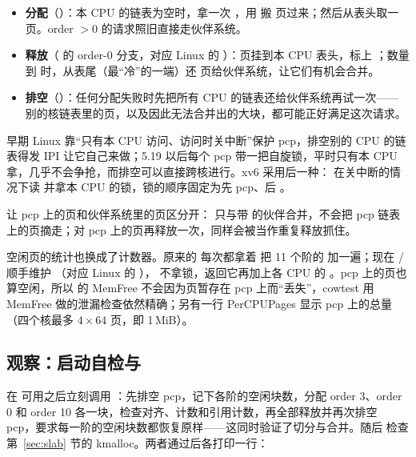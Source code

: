 \begin{itemize}
  \item \textbf{分配}（）：本 CPU 的链表为空时，拿一次 ，用  搬  页过来；然后从表头取一页。order $>0$ 的请求照旧直接走伙伴系统。
  \item \textbf{释放}（ 的 order-0 分支，对应 Linux 的 ）：页挂到本 CPU 表头，标上 ；数量到  时，从表尾（最“冷”的一端）还  页给伙伴系统，让它们有机会合并。
  \item \textbf{排空}（）：任何分配失败时先把所有 CPU 的链表还给伙伴系统再试一次——别的核链表里的页，以及因此无法合并出的大块，都可能正好满足这次请求。
\end{itemize}

早期 Linux 靠“只有本 CPU 访问、访问时关中断”保护 pcp，排空别的 CPU 的链表得发 IPI 让它自己来做；5.19 以后每个 pcp 带一把自旋锁，平时只有本 CPU 拿，几乎不会争抢，而排空可以直接跨核进行。xv6 采用后一种： 在关中断的情况下读  并拿本 CPU 的锁，锁的顺序固定为先 pcp、后 。

 让 pcp 上的页和伙伴系统里的页区分开： 只与带  的伙伴合并，不会把 pcp 链表上的页摘走；对 pcp 上的页再释放一次，同样会被当作重复释放抓住。

空闲页的统计也换成了计数器。原来的  每次都拿着  把 11 个阶的  加一遍；现在 / 顺手维护 （对应 Linux 的 ）， 不拿锁，返回它再加上各 CPU 的 。pcp 上的页也算空闲，所以  的 MemFree 不会因为页暂存在 pcp 上而“丢失”，cowtest 用 MemFree 做的泄漏检查依然精确；另有一行 PerCPUPages 显示 pcp 上的总量（四个核最多 $4\times 64$ 页，即 1\,MiB）。

\subsection{观察：启动自检与 }

 在  可用之后立刻调用 ：先排空 pcp，记下各阶的空闲块数，分配 order 3、order 0 和 order 10 各一块，检查对齐、计数和引用计数，再全部释放并再次排空 pcp，要求每一阶的空闲块数都恢复原样——这同时验证了切分与合并。随后  检查第~\ref{sec:slab} 节的 kmalloc。两者通过后各打印一行：

